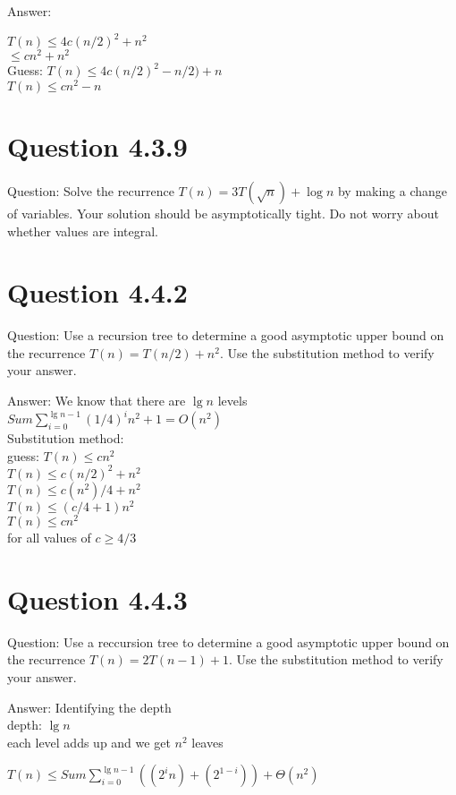 \documentclass[12pt]{article}
\begin{document}
Answer: 

$T(n) \le 4c(n / 2)^2 + n^2$ \\ 

	 $\le cn^2 + n^2 $ \\
Guess: $T(n) \le 4c(n / 2)^2 - n/2 ) + n$\\

$T(n) \le cn^2 - n$
	 
	 
	 
\section{Question 4.3.9}
Question: Solve the recurrence $T(n) = 3T(\sqrt n) + \log n$ by making a change of variables. Your solution should be asymptotically tight. Do not worry about whether values are integral.	



\section{Question 4.4.2}
Question: Use a recursion tree to determine a good asymptotic upper bound on the recurrence $T(n) = T(n / 2) + n^2$. Use the substitution method to verify your answer. 

Answer: 
We know that there are $\lg{n}$ levels\\
$ Sum \sum_{i=0}^{\lg n-1} (1/4)^i n^2 +1  = O(n^2) 	$ \\
Substitution method: \\
guess: $T(n) \le cn^2$ \\
$ T(n) \le  c(n/2)^2 + n^2 $\\
$ T(n) \le  c(n^2)/4 + n^2 $\\
$ T(n) \le  (c/4+1)n^2 $\\
$ T(n) \le  cn^2 $\\
for all values of $c \ge 4/3$

\section{Question 4.4.3}
Question: Use a reccursion tree to determine a good asymptotic upper bound on the recurrence $T(n) = 2T(n - 1) + 1$. Use the substitution method to verify your answer.

Answer: 
Identifying the depth \\
depth: $\lg n $ \\
each level adds up and we get $n^2$ leaves

$ T(n) \le Sum \sum_{i=0}^{\lg n-1} ((2^i n) + (2 ^{1-i}))+ \Theta(n^2) 	$ \\
\end{document}
